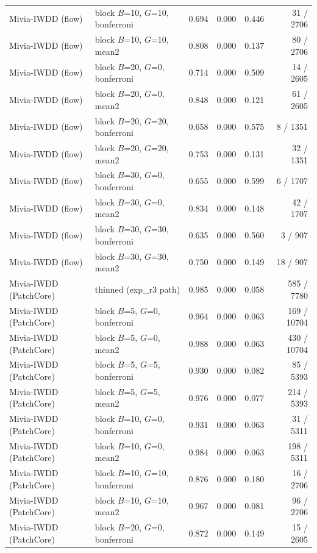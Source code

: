 \begin{table}[t]
{\begin{tabular}{llrrrr}
Mivia-IWDD (flow) & block $B$=10, $G$=10, bonferroni & 0.694 & 0.000 & 0.446 & 31 / 2706 \\
Mivia-IWDD (flow) & block $B$=10, $G$=10, mean2 & 0.808 & 0.000 & 0.137 & 80 / 2706 \\
Mivia-IWDD (flow) & block $B$=20, $G$=0, bonferroni & 0.714 & 0.000 & 0.509 & 14 / 2605 \\
Mivia-IWDD (flow) & block $B$=20, $G$=0, mean2 & 0.848 & 0.000 & 0.121 & 61 / 2605 \\
Mivia-IWDD (flow) & block $B$=20, $G$=20, bonferroni & 0.658 & 0.000 & 0.575 & 8 / 1351 \\
Mivia-IWDD (flow) & block $B$=20, $G$=20, mean2 & 0.753 & 0.000 & 0.131 & 32 / 1351 \\
Mivia-IWDD (flow) & block $B$=30, $G$=0, bonferroni & 0.655 & 0.000 & 0.599 & 6 / 1707 \\
Mivia-IWDD (flow) & block $B$=30, $G$=0, mean2 & 0.834 & 0.000 & 0.148 & 42 / 1707 \\
Mivia-IWDD (flow) & block $B$=30, $G$=30, bonferroni & 0.635 & 0.000 & 0.560 & 3 / 907 \\
Mivia-IWDD (flow) & block $B$=30, $G$=30, mean2 & 0.750 & 0.000 & 0.149 & 18 / 907 \\
Mivia-IWDD (PatchCore) & thinned (exp_r3 path) & 0.985 & 0.000 & 0.058 & 585 / 7780 \\
Mivia-IWDD (PatchCore) & block $B$=5, $G$=0, bonferroni & 0.964 & 0.000 & 0.063 & 169 / 10704 \\
Mivia-IWDD (PatchCore) & block $B$=5, $G$=0, mean2 & 0.988 & 0.000 & 0.063 & 430 / 10704 \\
Mivia-IWDD (PatchCore) & block $B$=5, $G$=5, bonferroni & 0.930 & 0.000 & 0.082 & 85 / 5393 \\
Mivia-IWDD (PatchCore) & block $B$=5, $G$=5, mean2 & 0.976 & 0.000 & 0.077 & 214 / 5393 \\
Mivia-IWDD (PatchCore) & block $B$=10, $G$=0, bonferroni & 0.931 & 0.000 & 0.063 & 31 / 5311 \\
Mivia-IWDD (PatchCore) & block $B$=10, $G$=0, mean2 & 0.984 & 0.000 & 0.063 & 198 / 5311 \\
Mivia-IWDD (PatchCore) & block $B$=10, $G$=10, bonferroni & 0.876 & 0.000 & 0.180 & 16 / 2706 \\
Mivia-IWDD (PatchCore) & block $B$=10, $G$=10, mean2 & 0.967 & 0.000 & 0.081 & 96 / 2706 \\
Mivia-IWDD (PatchCore) & block $B$=20, $G$=0, bonferroni & 0.872 & 0.000 & 0.149 & 15 / 2605 \\

\end{tabular}}
\end{table}
